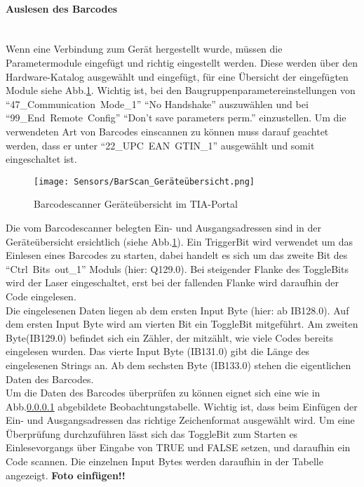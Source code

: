\paragraph{Auslesen des Barcodes}\mbox{}\\
Wenn eine Verbindung zum Gerät hergestellt wurde, müssen die Parametermodule eingefügt und richtig eingestellt werden. Diese werden über den Hardware-Katalog ausgewählt und eingefügt, für eine Übersicht der eingefügten Module siehe Abb.\ref{BarScan_TIA}. Wichtig ist, bei den Baugruppenparametereinstellungen von \enquote{\mbox{47\_Communication Mode\_1}} \enquote{No Handshake} auszuwählen und bei \enquote{\mbox{99\_End Remote Config}}
\enquote{Don't save parameters perm.} einzustellen. Um die verwendeten Art von Barcodes einscannen zu können muss darauf geachtet werden, dass er unter \enquote{\mbox{22\_UPC EAN GTIN\_1}} ausgewählt und somit eingeschaltet ist.\\

\begin{figure}[h]
    \centering
    \texttt{[image: Sensors/BarScan\_Geräteübersicht.png]}
    \caption{Barcodescanner Geräteübersicht im TIA-Portal\cite{BarScan_pic}}
    \label{BarScan_TIA}
\end{figure}

Die vom Barcodescanner belegten Ein- und Ausgangsadressen sind in der Geräteübersicht ersichtlich (siehe Abb.\ref{BarScan_TIA}). Ein TriggerBit wird verwendet um das Einlesen eines Barcodes zu starten, dabei handelt es sich um das zweite Bit des \enquote{\mbox{Ctrl Bits out\_1}} Moduls (hier: Q129.0). Bei steigender Flanke des ToggleBits wird der Laser eingeschaltet, erst bei der fallenden Flanke wird daraufhin der Code eingelesen.\\
Die eingelesenen Daten liegen ab dem ersten Input Byte (hier: ab IB128.0). Auf dem ersten Input Byte wird am vierten Bit ein ToggleBit mitgeführt. Am zweiten Byte(IB129.0) befindet sich ein Zähler, der mitzählt, wie viele Codes bereits eingelesen wurden. Das vierte Input Byte (IB131.0) gibt die Länge des eingelesenen Strings an. Ab dem sechsten Byte (IB133.0) stehen die eigentlichen Daten des Barcodes.\\
Um die Daten des Barcodes überprüfen zu können eignet sich eine wie in Abb.\ref{} abgebildete Beobachtungstabelle. Wichtig ist, dass beim Einfügen der Ein- und Ausgangsadressen das richtige Zeichenformat ausgewählt wird. Um eine Überprüfung durchzuführen lässt sich das ToggleBit zum Starten es Einlesevorgangs über Eingabe von TRUE und FALSE setzen, und daraufhin ein Code scannen. Die einzelnen Input Bytes werden daraufhin in der Tabelle angezeigt. \textbf{Foto einfügen!!}

